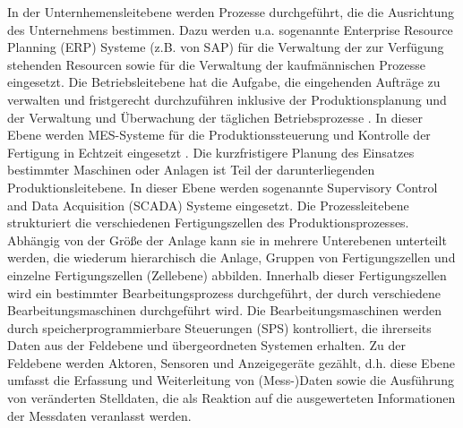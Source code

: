 In der Unternhemensleitebene werden Prozesse durchgeführt, die die Ausrichtung des Unternehmens bestimmen. Dazu werden u.a. sogenannte Enterprise Resource Planning (ERP) Systeme (z.B. von SAP) für die Verwaltung der zur Verfügung stehenden Resourcen sowie für die Verwaltung der kaufmännischen Prozesse eingesetzt.
Die Betriebsleitebene hat die Aufgabe, die eingehenden Aufträge zu verwalten und fristgerecht durchzuführen inklusive der Produktionsplanung und der Verwaltung und Überwachung der täglichen Betriebsprozesse \citep{Linke2017}. In dieser Ebene werden MES-Systeme für die Produktionssteuerung und Kontrolle der Fertigung in Echtzeit eingesetzt \cite{MES1}. %
Die kurzfristigere Planung des Einsatzes bestimmter Maschinen oder Anlagen ist Teil der darunterliegenden Produktionsleitebene. In dieser Ebene werden sogenannte Supervisory Control and Data Acquisition (SCADA) Systeme eingesetzt. 
Die Prozessleitebene strukturiert die verschiedenen Fertigungszellen des Produktionsprozesses. Abhängig von der Größe der Anlage kann sie in mehrere Unterebenen unterteilt werden, die wiederum hierarchisch die Anlage, Gruppen von Fertigungszellen und einzelne Fertigungszellen (Zellebene) abbilden. Innerhalb dieser Fertigungszellen wird ein bestimmter Bearbeitungsprozess durchgeführt, der durch verschiedene Bearbeitungsmaschinen durchgeführt wird. Die Bearbeitungsmaschinen werden durch speicherprogrammierbare Steuerungen (SPS) kontrolliert, die ihrerseits Daten aus der Feldebene und übergeordneten Systemen erhalten.
Zu der Feldebene werden Aktoren, Sensoren und Anzeigegeräte gezählt, d.h. diese Ebene umfasst die Erfassung und Weiterleitung von (Mess-)Daten sowie die Ausführung von veränderten Stelldaten, die als Reaktion auf die ausgewerteten Informationen der Messdaten veranlasst werden\citep{Linke2017}.

